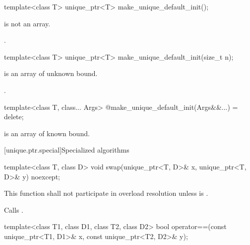%
\begin{itemdecl}
template<class T> unique_ptr<T> make_unique_default_init();
\end{itemdecl}

\begin{itemdescr}
\pnum
\constraints
{} is not an array.

\pnum
\returns
{}.
\end{itemdescr}

%
\begin{itemdecl}
template<class T> unique_ptr<T> make_unique_default_init(size_t n);
\end{itemdecl}

\begin{itemdescr}
\pnum
\constraints
{} is an array of unknown bound.

\pnum
\returns
{}.
\end{itemdescr}

%
\begin{itemdecl}
template<class T, class... Args> @\unspec@ make_unique_default_init(Args&&...) = delete;
\end{itemdecl}

\begin{itemdescr}
\pnum
\constraints
{} is an array of known bound.
\end{itemdescr}

[unique.ptr.special]{Specialized algorithms}

%
\begin{itemdecl}
template<class T, class D> void swap(unique_ptr<T, D>& x, unique_ptr<T, D>& y) noexcept;
\end{itemdecl}

\begin{itemdescr}
\pnum
\remarks
This function shall not participate in overload resolution
unless  is .

\pnum
\effects
Calls .
\end{itemdescr}

%
\begin{itemdecl}
template<class T1, class D1, class T2, class D2>
  bool operator==(const unique_ptr<T1, D1>& x, const unique_ptr<T2, D2>& y);
\end{itemdecl}

